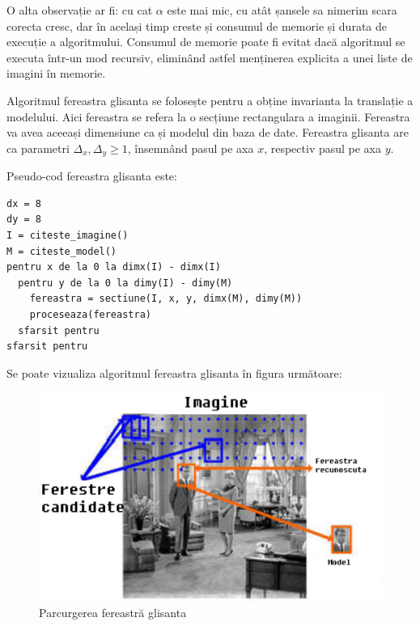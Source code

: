 O alta observație ar fi: cu cat ${\alpha}$ este mai mic, cu atât șansele sa nimerim scara corecta cresc, dar în același timp creste și consumul de memorie și durata de execuție a algoritmului.
Consumul de memorie poate fi evitat dacă algoritmul se executa într-un mod recursiv, eliminând astfel menținerea explicita a unei liste de imagini în memorie.

Algoritmul fereastra glisanta se folosește pentru a obține invarianta la translație a modelului.
Aici fereastra se refera la o secțiune rectangulara a imaginii.
Fereastra va avea aceeași dimensiune ca și modelul din baza de date.
Fereastra glisanta are ca parametri ${\Delta_x, \Delta_y \geq 1}$, însemnând pasul pe axa ${x}$, respectiv pasul pe axa ${y}$.

Pseudo-cod fereastra glisanta este:
\begin{mdframed}
\begin{verbatim}
dx = 8
dy = 8
I = citeste_imagine()
M = citeste_model()
pentru x de la 0 la dimx(I) - dimx(I)
  pentru y de la 0 la dimy(I) - dimy(M)
    fereastra = sectiune(I, x, y, dimx(M), dimy(M))
    proceseaza(fereastra)
  sfarsit pentru
sfarsit pentru
\end{verbatim}
\end{mdframed}

Se poate vizualiza algoritmul fereastra glisanta în figura următoare:
\begin{figure}[H]
	\centering
		\includegraphics[width=1.00\textwidth]{imagini/sliding_window.png}
	\caption{Parcurgerea fereastră glisanta\protect\footnotemark}
	\label{fig:sliding_window}
\end{figure}


